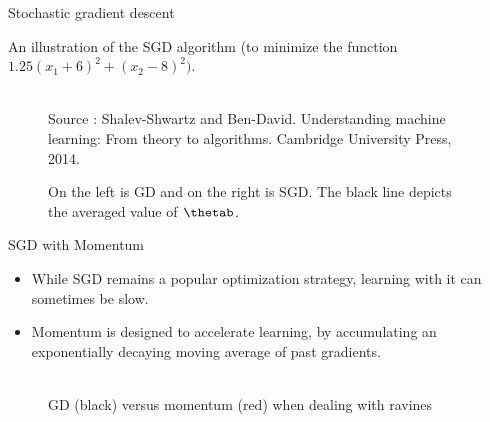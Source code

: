 \begin{vbframe}{Stochastic gradient descent}
  \framebreak

 
 An illustration of the SGD algorithm (to minimize the function $1.25(x_1 + 6)^2 + (x_2 - 8)^2)$.
 \begin{figure}
    \tiny{\\ Source : Shalev-Shwartz and  Ben-David.
Understanding machine learning: From theory to algorithms. Cambridge University Press, 2014. }
 \caption{On the left is GD and on the right is SGD. The black line depicts the averaged value of $\thetab$.}
 \end{figure}

  \end{vbframe}
  

\begin{vbframe}{SGD with Momentum}
\begin{itemize}
\item While SGD remains a popular optimization strategy, learning with it can sometimes be slow.
\item Momentum is designed to accelerate learning, by accumulating an exponentially decaying moving average of past gradients.
\end{itemize}
\begin{figure}
\centering
{}
\\GD (black) versus momentum (red) when dealing with ravines
\end{figure}
\end{vbframe}

